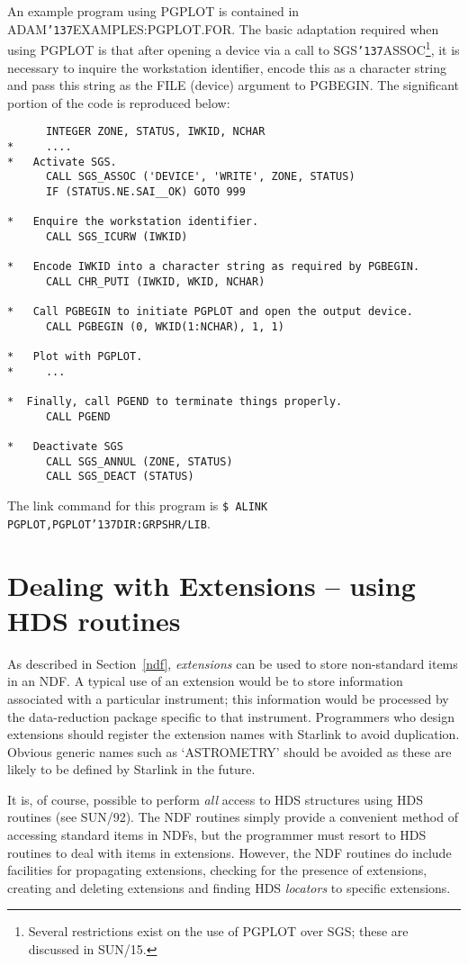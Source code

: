\documentclass[twoside,11pt]{article}
\renewcommand{\_}{{\tt\char'137}}
\newcommand{\xref}[3]{#1}
\newcommand{\xlabel}[1]{}
\begin{document}
An example program using PGPLOT is contained in ADAM\_EXAMPLES:PGPLOT.FOR.
The basic adaptation required when using PGPLOT is that after opening
a device via a call to 
SGS\_ASSOC\footnote{Several restrictions exist on the use of PGPLOT over SGS;
these are discussed in \xref{SUN/15}{sun15}{}.}, it is necessary to 
inquire the workstation identifier, encode this as a character string and pass 
this string as the FILE (device) argument to PGBEGIN.
The significant portion of the code is reproduced below:
\begin{verbatim}
      INTEGER ZONE, STATUS, IWKID, NCHAR
*     ....
*   Activate SGS.
      CALL SGS_ASSOC ('DEVICE', 'WRITE', ZONE, STATUS)
      IF (STATUS.NE.SAI__OK) GOTO 999

*   Enquire the workstation identifier.  
      CALL SGS_ICURW (IWKID)
   
*   Encode IWKID into a character string as required by PGBEGIN.
      CALL CHR_PUTI (IWKID, WKID, NCHAR)

*   Call PGBEGIN to initiate PGPLOT and open the output device.
      CALL PGBEGIN (0, WKID(1:NCHAR), 1, 1)

*   Plot with PGPLOT.
*     ...

*  Finally, call PGEND to terminate things properly.
      CALL PGEND

*   Deactivate SGS
      CALL SGS_ANNUL (ZONE, STATUS)
      CALL SGS_DEACT (STATUS)
\end{verbatim}
The link command for this  program is 
{\tt \$ ALINK PGPLOT,PGPLOT\_DIR:GRPSHR/LIB}.

\newpage
\section{Dealing with Extensions -- using HDS routines\label{extensions}\xlabel{dealing_with_extensions}}

As described in Section~\ref{ndf}, {\sl extensions} can be used to store
non-standard items in an NDF.
A typical use of an extension would be to store information 
associated with a particular instrument;
this information would be processed by the data-reduction package specific 
to that instrument.
Programmers who design extensions  should register
the extension names with Starlink to avoid duplication.
Obvious generic names such as `ASTROMETRY' should be avoided  as these are 
likely to be defined by Starlink in the future.

It is, of course, possible to perform {\sl all\/} access to HDS structures
using HDS routines (see \xref{SUN/92}{sun92}{}). The NDF routines simply
provide a convenient method of accessing standard items in NDFs, but
the programmer must 
resort to HDS routines to deal with items in extensions.
However, the NDF routines do include facilities for propagating extensions,
checking for the presence of extensions, creating and deleting extensions
and finding HDS {\sl locators\/} to specific extensions.
\end{document}
